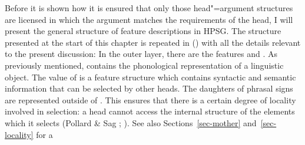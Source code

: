 Before it is shown how it is ensured that only those head"=argument structures are licensed in which the argument matches the requirements of the head, I will
present the general structure of feature descriptions in HPSG. The structure presented at the start of this chapter is repeated in () with all the details
relevant to the present discussion:
\ea
\label{LE-Grammatik}
\z
In the outer layer, there are the features \phon and \synsem. As previously mentioned, \phon contains the phonological representation of a linguistic
object. The value of \synsem is a feature structure which contains syntactic and semantic information that can be selected by other heads.
The daughters of phrasal signs are represented outside of \synsem. This ensures that there is a
certain degree of locality involved in selection: a head cannot access the internal
structure of the elements which it selects (Pollard \& Sag \citeyear[--145]{ps};
\citeyear[]{ps2}). See also Sections~\ref{sec-mother} and~\ref{sec-locality} for a

